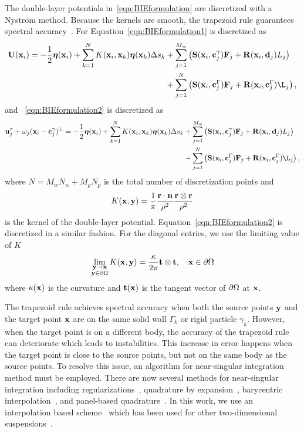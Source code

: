 \documentclass[preprint, 10pt]{elsarticle}
\begin{document}
The double-layer potentials in~\eqref{eqn:BIEformulation} are
discretized with a Nystr\"om method.  Because the kernels are smooth,
the trapezoid rule guarantees spectral accuracy~\cite{Trefethan2014}.  For
Equation~\eqref{eqn:BIEformulation1} is discretized as
\begin{equation*}
  \begin{aligned}
  \UU(\xx_i) = -\frac{1}{2}\eeta(\xx_i) + 
  \sum_{k=1}^{N} K(\xx_i,\xx_k) \eeta(\xx_k) \Delta s_k
    &+ \sum_{j=1}^{M_w} \left(\mathbf{S}(\xx_i,\cc^\gamma_j)\FF_j +
    \mathbf{R}(\xx_i,\dd_j)L_j\right)  \\
    &+ \sum_{j=1}^{N} \left(\mathbf{S}(\xx_i,\cc^\Gamma_j)\FF_j +
    \mathbf{R}(\xx_i,\cc^\Gamma_j)\L_j\right),
  \end{aligned}
\end{equation*}
and ~\eqref{eqn:BIEformulation2} is discretized as
\begin{equation*}
  \begin{aligned}
\uu^\tau_j + \omega_j(\xx_i - \cc^\gamma_j)^\perp = -\frac{1}{2}\eeta(\xx_i) +
\sum_{k=1}^{N} K(\xx_i,\xx_k) \eeta(\xx_k) \Delta s_k
    &+ \sum_{j=1}^{M_w} \left(\mathbf{S}(\xx_i,\cc^\gamma_j)\FF_j +
    \mathbf{R}(\xx_i,\dd_j)L_j\right)  \\
    &+ \sum_{j=1}^{N} \left(\mathbf{S}(\xx_i,\cc^\Gamma_j)\FF_j +
    \mathbf{R}(\xx_i,\cc^\Gamma_j)\L_j\right),
  \end{aligned}
\end{equation*}
where $N = M_w N_w + M_p N_p$ is the total number of discretization
points and
\begin{align*}
  K({\mathbf{x}},{\mathbf{y}}) = \frac{1}{\pi} \frac{{\mathbf{r}} \cdot {\mathbf{n}}}{\rho^2} 
               \frac{{\mathbf{r}} \otimes {\mathbf{r}}}{\rho^2}
\end{align*}
is the kernel of the double-layer potential.
Equation~\eqref{eqn:BIEformulation2} is discretized in a similar
fashion.  For the diagonal entries, we use the limiting value of $K$
\begin{align*}
  \lim_{\substack{{\mathbf{y}} \rightarrow {\mathbf{x}} \\ {\mathbf{y}} \in {\partial}\Omega}} 
    K({\mathbf{x}},{\mathbf{y}}) = \frac{\kappa}{2\pi}{\mathbf{t}}\otimes{\mathbf{t}},
    \quad {\mathbf{x}} \in {\partial}\Omega
\end{align*}
where $\kappa({\mathbf{x}})$ is the curvature and ${\mathbf{t}}({\mathbf{x}})$ is the tangent
vector of ${\partial}\Omega$ at ${\mathbf{x}}$.

The trapezoid rule achieves spectral accuracy when both the source
points ${\mathbf{y}}$ and the target point ${\mathbf{x}}$ are on the same solid wall
$\Gamma_k$ or rigid particle $\gamma_k$.  However, when the target point
is on a different body, the accuracy of the trapezoid rule can
deteriorate which leads to instabilities.  This increase in error
happens when the target point is close to the source points, but not on
the same body as the source points.  To resolve this issue, an algorithm
for near-singular integration method must be employed.  There are now
several methods for near-singular integration including
regularizations~\cite{Beale2001}, quadrature by
expansion~\cite{Klockner2013}, barycentric
interpolation~\cite{Barnett2015}, and panel-based
quadrature~\cite{Helsing2008}.  In this work, we use an interpolation
based scheme~\cite{Ying2006} which has been used for other
two-dimensional suspensions~\cite{Quaife2014}.
\end{document}
